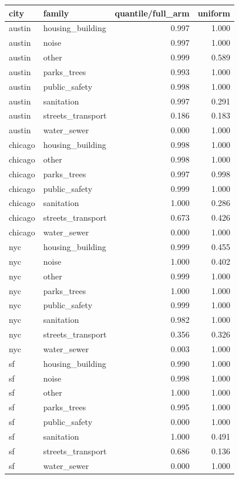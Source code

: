 \begin{tabular}{llrr}
\toprule
city & family & quantile/full\_arm & uniform \\
\midrule
austin & housing\_building & 0.997 & 1.000 \\
austin & noise & 0.997 & 1.000 \\
austin & other & 0.999 & 0.589 \\
austin & parks\_trees & 0.993 & 1.000 \\
austin & public\_safety & 0.998 & 1.000 \\
austin & sanitation & 0.997 & 0.291 \\
austin & streets\_transport & 0.186 & 0.183 \\
austin & water\_sewer & 0.000 & 1.000 \\
chicago & housing\_building & 0.998 & 1.000 \\
chicago & other & 0.998 & 1.000 \\
chicago & parks\_trees & 0.997 & 0.998 \\
chicago & public\_safety & 0.999 & 1.000 \\
chicago & sanitation & 1.000 & 0.286 \\
chicago & streets\_transport & 0.673 & 0.426 \\
chicago & water\_sewer & 0.000 & 1.000 \\
nyc & housing\_building & 0.999 & 0.455 \\
nyc & noise & 1.000 & 0.402 \\
nyc & other & 0.999 & 1.000 \\
nyc & parks\_trees & 1.000 & 1.000 \\
nyc & public\_safety & 0.999 & 1.000 \\
nyc & sanitation & 0.982 & 1.000 \\
nyc & streets\_transport & 0.356 & 0.326 \\
nyc & water\_sewer & 0.003 & 1.000 \\
sf & housing\_building & 0.990 & 1.000 \\
sf & noise & 0.998 & 1.000 \\
sf & other & 1.000 & 1.000 \\
sf & parks\_trees & 0.995 & 1.000 \\
sf & public\_safety & 0.000 & 1.000 \\
sf & sanitation & 1.000 & 0.491 \\
sf & streets\_transport & 0.686 & 0.136 \\
sf & water\_sewer & 0.000 & 1.000 \\
\bottomrule
\end{tabular}
